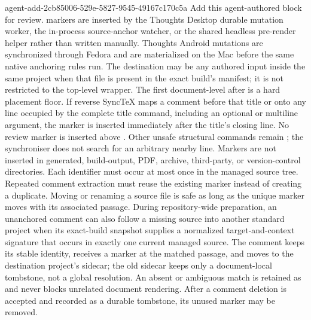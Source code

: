 \agentProposedEdit
  {agent-add-2cb85006-529e-5827-9545-49167c170c5a}
  {Add this agent-authored block for review.}
  {}
  {\code{\ReviewAnchor} markers are inserted by the Thoughts Desktop durable mutation worker, the in-process source-anchor watcher, or the shared headless pre-render helper rather than written manually.
Thoughts Android mutations are synchronized through Fedora and are materialized on the Mac before the same native anchoring rules run.}
The destination may be any authored  input inside the same  project when that file is present in the exact build's  manifest; it is not restricted to the top-level  wrapper.
The first document-level \code{\docTitle} after
 is a hard placement floor.
If reverse SyncTeX maps a comment before that title or onto any line occupied
by the complete title command, including an optional or multiline argument,
the marker is inserted immediately after the title's closing line.
No review marker is inserted above \code{\docTitle}.
Other unsafe structural commands remain ; the synchroniser
does not search for an arbitrary nearby line.
Markers are not inserted in generated, build-output, PDF, archive, third-party, or version-control directories.
Each identifier must occur at most once in the managed source tree.
Repeated comment extraction must reuse the existing marker instead of creating a duplicate.
Moving or renaming a source file is safe as long as the unique marker moves with its associated passage.
During repository-wide preparation, an unanchored comment can also follow a
missing source into another standard  project when its exact-build
snapshot supplies a normalized target-and-context signature that occurs in
exactly one current managed source.
The comment keeps its stable identity, receives a marker at the matched
passage, and moves to the destination project's sidecar; the old sidecar keeps
only a document-local  tombstone, not a global resolution.
An absent or ambiguous match is retained as  and never
blocks unrelated document rendering.
After a comment deletion is accepted and recorded as a durable tombstone, its unused marker may be removed.

